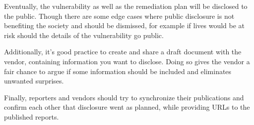 Eventually, the vulnerability as well as the remediation plan will be disclosed to the public. Though there are some edge cases where public disclosure is not benefiting the society and should be dismissed, for example if lives would be at risk should the details of the vulnerability go public.

Additionally, it's good practice to create and share a draft document with the vendor, containing information you want to disclose. Doing so gives the vendor a fair chance to argue if some information should be included and eliminates unwanted surprises.

Finally, reporters and vendors should try to synchronize their publications and confirm each other that disclosure went as planned, while providing URLs to the published reports.
